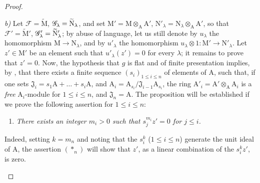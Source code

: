 \begin{proof}
\begin{enumerate}[label=(\roman*)]
  \emph{b)} Let $\mathscr{F}=\widetilde{\mathrm{M}}$, $\mathscr{G}_\lambda=\widetilde{\mathrm{N}}_\lambda$, and set $\mathrm{M}'=\mathrm{M}\otimes_\mathrm{A}\mathrm{A}'$, $\mathrm{N}'_\lambda=\mathrm{N}_\lambda\otimes_\mathrm{A}\mathrm{A}'$, so that $\mathscr{F}'=\widetilde{\mathrm{M}}'$, $\mathscr{G}'_\lambda=\widetilde{\mathrm{N}}'_\lambda$; by abuse of language, let us still denote by $u_\lambda$ the homomorphism $\mathrm{M}\to\mathrm{N}_\lambda$, and by $u'_\lambda$ the homomorphism $u_\lambda\otimes 1:\mathrm{M}'\to\mathrm{N}'_\lambda$.
  Let $z'\in\mathrm{M}'$ be an element such that $u'_\lambda(z')=0$ for every $\lambda$; it remains to prove that $z'=0$.
  Now, the hypothesis that $g$ is flat and of finite presentation implies, by , that there exists a finite sequence $(s_i)_{1\leq i\leq n}$ of elements of $\mathrm{A}$, such that, if one sets $\mathfrak J_i=s_1\mathrm{A}+\ldots+s_i\mathrm{A}$, and $\mathrm{A}_i=\mathrm{A}_{s_i}/\mathfrak{J}_{i-1}\mathrm{A}_{s_i}$, the ring $\mathrm{A}'_i=\mathrm{A}'\otimes_\mathrm{A}\mathrm{A}_i$ is a \emph{free} $\mathrm{A}_i$-module for $1\leq i\leq n$, and $\mathfrak{J}_n=\mathrm{A}$.
  The proposition will be established if we prove the following assertion for $1\leq i\leq n$:
  \begin{enumerate}[label=$(*_i)$]
    \item \emph{There exists an integer $m_i>0$ such that $s_j^{m_i}z'=0$ for $j\leq i$.}
  \end{enumerate}
  Indeed, setting $k=m_n$ and noting that the $s_i^k$ ($1\leq i\leq n$) generate the unit ideal of $\mathrm{A}$, the assertion $(*_n)$ will show that $z'$, as a linear combination of the $s_i^k z'$, is zero.


\end{enumerate}
\end{proof}
